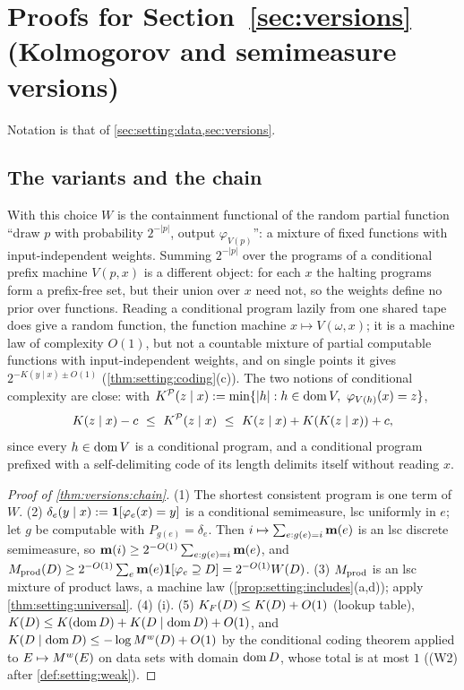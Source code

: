 \section{Proofs for Section~\ref{sec:versions} (Kolmogorov and semimeasure versions)}\label{app:versions}

Notation is that of \cref{sec:setting:data,sec:versions}.

\subsection{The variants and the chain}\label{app:versions:chain}

\begin{remark}\label{rem:versions:Wdelim}
With this choice $W$ is the containment functional of the random partial function ``draw $p$ with probability $2^{-|p|}$, output $\varphi_{V(p)}$'': a mixture of fixed functions with input-independent weights. Summing $2^{-|p|}$ over the programs of a conditional prefix machine $V(p,x)$ is a different object: for each $x$ the halting programs form a prefix-free set, but their union over $x$ need not, so the weights define no prior over functions. Reading a conditional program lazily from one shared tape does give a random function, the function machine $x\mapsto V(\omega,x)$; it is a machine law of complexity $O(1)$, but not a countable mixture of partial computable functions with input-independent weights, and on single points it gives $2^{-K(y\mid x)\pm O(1)}$ (\cref{thm:setting:coding}(c)). The two notions of conditional complexity are close: with $\KP(z\mid x):=\min\{|h|:h\in\dom V,\ \varphi_{V(h)}(x)=z\}$,
\[
K(z\mid x)-c\ \le\ K^{\mathcal{P}}(z\mid x)\ \le\ K(z\mid x)+K(K(z\mid x))+c,
\]
since every $h\in\operatorname{dom} V$ is a conditional program, and a conditional program prefixed with a self-delimiting code of its length delimits itself without reading $x$.
\end{remark}

\begin{proof}[Proof of \cref{thm:versions:chain}]
(1) The shortest consistent program is one term of $W$. (2) $\delta_e(y\mid x):=\mathbf{1}[\varphi_e(x)=y]$ is a conditional semimeasure, lsc uniformly in $e$; let $g$ be computable with $P_{g(e)}=\delta_e$. Then $i\mapsto\sum_{e:g(e)=i}\mathbf{m}(e)$ is an lsc discrete semimeasure, so $\mathbf{m}(i)\ge2^{-O(1)}\sum_{e:g(e)=i}\mathbf{m}(e)$, and $M_{\mathrm{prod}}(D)\ge2^{-O(1)}\sum_e\mathbf{m}(e)\mathbf{1}[\varphi_e\supseteq D]=2^{-O(1)}W(D)$. (3) $M_{\mathrm{prod}}$ is an lsc mixture of product laws, a machine law (\cref{prop:setting:includes}(a,d)); apply \cref{thm:setting:universal}. (4) (i). (5) $K_{F}(D)\le K(D)+O(1)$ (lookup table), $K(D)\le K(\operatorname{dom} D)+K(D\mid\operatorname{dom} D)+O(1)$, and $K(D\mid\operatorname{dom} D)\le-\log M^{w}(D)+O(1)$ by the conditional coding theorem applied to $E\mapsto M^{w}(E)$ on data sets with domain $\operatorname{dom} D$, whose total is at most $1$ ((W2) after \cref{def:setting:weak}).
\end{proof}

